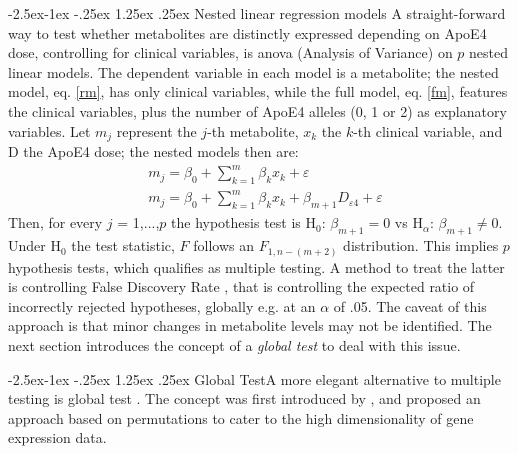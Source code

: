 \documentclass{amsart}
\makeatletter
\renewcommand\paragraph{\@startsection{paragraph}{4}{\z@}%
            {-2.5ex\@plus -1ex \@minus -.25ex}%
            {1.25ex \@plus .25ex}%
            {\normalfont\normalsize\bfseries}}
\makeatother
\begin{document}
\paragraph{Nested linear regression models}
A straight-forward way to test whether metabolites are distinctly expressed depending on ApoE4 dose, controlling for clinical variables, is \acrshort{anova} (Analysis of Variance) on $p$ nested linear models. The dependent variable in each model is a metabolite; the nested model, eq. \eqref{rm}, has only clinical variables, while the full model, eq. \eqref{fm}, features the clinical variables, plus the number of ApoE4 alleles (0, 1 or 2) as explanatory variables. Let $m_j$ represent the $j$-th metabolite, $x_k$ the $k$-th clinical variable, and D the ApoE4 dose; the nested models then are:
\begin{align}
    & m_j = \beta_0 + \sum_{k=1}^m\beta_kx_k +\varepsilon \label{rm} \\
    & m_j = \beta_0 + \sum_{k=1}^m\beta_kx_k + \beta_{m+1}D_{\varepsilon4} + \varepsilon \label{fm}
\end{align}
Then, for every $j$ = 1,...,$p$ the hypothesis test is H$_0$: $\beta_{m+1} = 0 $ vs H$_\alpha$: $\beta_{m+1} \neq 0$. Under H$_0$ the test statistic, $F$ follows an $F_{1, n-(m+2)}$ distribution. This implies $p$ hypothesis tests, which qualifies as multiple testing. A method to treat the latter is controlling False Discovery Rate \cite{Benjamini1995ControllingTesting}, that is controlling the expected ratio of incorrectly rejected hypotheses, globally e.g. at an $\alpha$ of .05. The caveat of this approach is that minor changes in metabolite levels may not be identified. The next section introduces the concept of a \textit{global test} to deal with this issue.

\paragraph{Global Test}A more elegant alternative to multiple testing is global test \cite{Simon2004DesignHealth}. The concept was first introduced by \citeauthor{Simon2004DesignHealth}, and proposed an approach based on permutations to cater to the high dimensionality of gene expression data.
\end{document}
